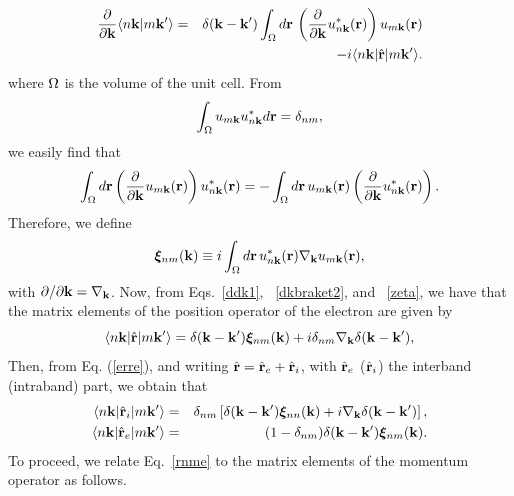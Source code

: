 \documentclass[floatfix,prb,aps,superscriptaddress,11pt,preprint]{revtex4}
\begin{document}
\begin{eqnarray}\label{dkbraket3}
\frac{\partial}{\partial\mathbf{k}}
\langle {n\mathbf{k}} | {m\mathbf{k}'} \rangle
&=&
\delta(\mathbf{k}-\mathbf{k}')\int_\Omega d\mathbf{r}\,
\left(\frac{\partial}{\partial\mathbf{k}} u^*_{n\mathbf{k}}(\mathbf{r})\right)
u_{m\mathbf{k}}(\mathbf{r})
\nonumber \\
&&-i
\langle n\mathbf{k} |\hat{\mathbf{r}}| m\mathbf{k}' \rangle.
\end{eqnarray}
where $\Omega$ is the volume of the unit cell.
From
\begin{equation}\label{dnm1}
\int_\Omega u_{m\mathbf{k}}u^*_{n\mathbf{k}}d\mathbf{r}=\delta_{nm},
\end{equation}
we easily find that
\begin{equation}\label{dnm2}
\int_\Omega d\mathbf{r}
\left(\frac{\partial}{\partial\mathbf{k}} u_{m\mathbf{k}}(\mathbf{r})\right)
u^*_{n\mathbf{k}}(\mathbf{r})=
-\int_\Omega 
d\mathbf{r}\,
u_{m\mathbf{k}}(\mathbf{r})
\left(\frac{\partial}{\partial\mathbf{k}} u^*_{n\mathbf{k}}(\mathbf{r})\right)
.
\end{equation}
Therefore, we define
\begin{equation}\label{zeta}
\boldsymbol{\xi}_{nm}(\mathbf{k}) \equiv i\int_{\Omega} d\mathbf{r}\, u^*_{n\mathbf{k}}(\mathbf{r})\nabla_{\mathbf{k}}u_{m\mathbf{k}}(\mathbf{r}),
\end{equation}
with $\partial/\partial\mathbf{k}=\nabla_{\mathbf{k}}$.
Now, from Eqs.~\eqref{ddk1}, ~\eqref{dkbraket2},
and ~\eqref{zeta},
 we have that the matrix elements of
the position operator of the electron are given by
\begin{equation}\label{erre}
\langle n\mathbf{k} |\hat{\mathbf{r}}| m\mathbf{k}' \rangle = \delta(\mathbf{k}-\mathbf{k}')\boldsymbol{\xi}_{nm}(\mathbf{k})
+i\delta_{nm}\nabla_{\mathbf{k}}\delta(\mathbf{k}-\mathbf{k}'),
\end{equation}
Then, from Eq. (\ref{erre}), and writing $\hat{\mathbf{r}}=\hat{\mathbf{r}}_e+\hat{\mathbf{r}}_i$, with
$\hat{\mathbf{r}}_e$ ($\hat{\mathbf{r}}_i$) the interband (intraband) part, we obtain that
\begin{eqnarray}\label{rnmi}
\langle n\mathbf{k} |\hat{\mathbf{r}}_i| m\mathbf{k}' \rangle &=& \delta_{nm}\left[\delta(\mathbf{k}-\mathbf{k}')\boldsymbol{\xi}_{nn}(\mathbf{k})
+i\nabla_{\mathbf{k}}\delta(\mathbf{k}-\mathbf{k}')\right], \\
\langle n\mathbf{k} |\hat{\mathbf{r}}_e| m\mathbf{k}' \rangle &=& (1-\delta_{nm})\delta(\mathbf{k}-\mathbf{k}')\boldsymbol{\xi}_{nm}(\mathbf{k}).
\label{rnme}
\end{eqnarray}
To proceed, we relate Eq.~\eqref{rnme} to the matrix elements of the
momentum operator as follows. 
\end{document}
